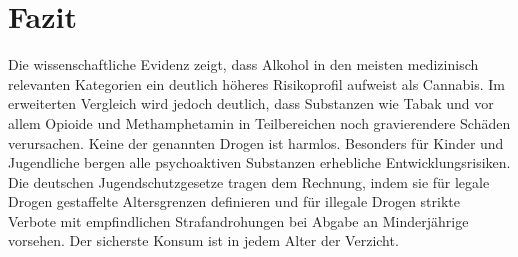 \documentclass[11pt,a4paper]{article}
\begin{document}
	\section{Fazit}
	
	Die wissenschaftliche Evidenz zeigt, dass Alkohol in den meisten medizinisch relevanten Kategorien ein deutlich höheres Risikoprofil aufweist als Cannabis. Im erweiterten Vergleich wird jedoch deutlich, dass Substanzen wie Tabak und vor allem Opioide und Methamphetamin in Teilbereichen noch gravierendere Schäden verursachen. Keine der genannten Drogen ist harmlos. Besonders für Kinder und Jugendliche bergen alle psychoaktiven Substanzen erhebliche Entwicklungsrisiken. Die deutschen Jugendschutzgesetze tragen dem Rechnung, indem sie für legale Drogen gestaffelte Altersgrenzen definieren und für illegale Drogen strikte Verbote mit empfindlichen Strafandrohungen bei Abgabe an Minderjährige vorsehen. Der sicherste Konsum ist in jedem Alter der Verzicht.
	
\end{document}
